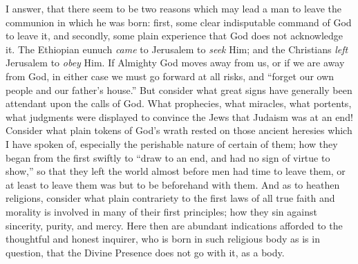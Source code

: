 I answer, that there seem to be two reasons which may lead a man to
leave the communion in which he was born: first, some clear
indisputable command of God to leave it, and secondly, some plain
experience that God does not acknowledge it. The Ethiopian eunuch \emph{came}
to Jerusalem to \emph{seek} Him; and the Christians \emph{left}
Jerusalem to \emph{obey} Him. If Almighty God moves away from us, or
if we are away from God, in either case we must go forward at all
risks, and ``forget our own people and our father's house.''
But consider what great signs have generally been attendant upon the
calls of God. What prophecies, what miracles, what portents, what
judgments were displayed to convince the Jews that Judaism was at an
end! Consider what plain tokens of God's wrath rested on those ancient
heresies which I have spoken of, especially the perishable nature of
certain of them; how they began from the first swiftly to ``draw
to an end, and had no sign of virtue to show,'' so that they left
the world almost before men had time to leave them, or at least to
leave them was but to be beforehand with them. And as to heathen
religions, consider what plain contrariety to the first laws of all
true faith and morality is involved in many of their first principles;
how they sin against sincerity, purity, and mercy. Here then are
abundant indications afforded to the thoughtful and honest inquirer,
who is born in such religious body as is in question, that the Divine
Presence does not go with it, as a body.

